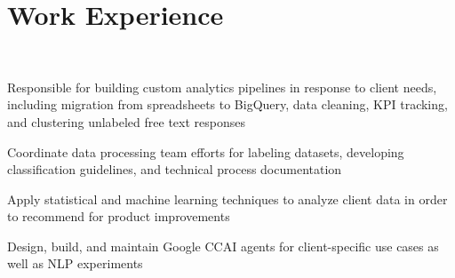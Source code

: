 \documentclass[letterpaper]{deedy-resume_sm} %
\begin{document}

\lastupdated %


\section{Work Experience}
\\

\vspace{\topsep} %
\begin{tightitemize}
\item Responsible for building custom analytics pipelines in response to client needs, including migration from spreadsheets to BigQuery, data cleaning, KPI tracking, and clustering unlabeled free text responses
\item Coordinate data processing team efforts for labeling datasets, developing classification guidelines, and technical process documentation
\end{tightitemize}

\vspace{\topsep} %
\begin{tightitemize}
\item Apply statistical and machine learning techniques to analyze client data in order to recommend for product improvements
\item Design, build, and maintain Google CCAI agents for client-specific use cases as well as NLP experiments
\end{tightitemize}
\end{document}
